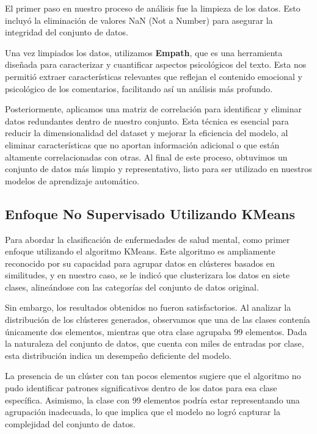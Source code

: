 \documentclass[
10pt, %
a4paper, %
oneside, %
headinclude,footinclude, %
BCOR5mm, %
]{scrartcl}
\begin{document}
El primer paso en nuestro proceso de análisis fue la limpieza de los datos. Esto incluyó la eliminación de valores NaN (Not a Number) para asegurar la integridad del conjunto de datos. 

Una vez limpiados los datos, utilizamos \textbf{Empath}, que es una herramienta diseñada para caracterizar y cuantificar aspectos psicológicos del texto. 
Esta nos permitió extraer características relevantes que reflejan el contenido emocional y psicológico de los comentarios, facilitando así un análisis más profundo.

Posteriormente, aplicamos una matriz de correlación para identificar y eliminar datos redundantes dentro de nuestro conjunto. 
Esta técnica es esencial para reducir la dimensionalidad del dataset y mejorar la eficiencia del modelo, al eliminar características que no aportan información adicional o que están altamente correlacionadas con otras. 
Al final de este proceso, obtuvimos un conjunto de datos más limpio y representativo, listo para ser utilizado en nuestros modelos de aprendizaje automático.


\subsection{Enfoque No Supervisado Utilizando KMeans}

Para abordar la clasificación de enfermedades de salud mental, como primer enfoque utilizando el algoritmo KMeans. Este algoritmo es ampliamente reconocido por su capacidad para agrupar datos en clústeres basados en similitudes, 
y en nuestro caso, se le indicó que clusterizara los datos en siete clases, alineándose con las categorías del conjunto de datos original.

Sin embargo, los resultados obtenidos no fueron satisfactorios. Al analizar la distribución de los clústeres generados, observamos que una de las clases contenía únicamente dos elementos, mientras que otra clase agrupaba 99 elementos. 
Dada la naturaleza del conjunto de datos, que cuenta con miles de entradas por clase, esta distribución indica un desempeño deficiente del modelo.

La presencia de un clúster con tan pocos elementos sugiere que el algoritmo no pudo identificar patrones significativos dentro de los datos para esa clase específica. Asimismo, la clase con 99 elementos podría estar representando una agrupación inadecuada,
lo que implica que el modelo no logró capturar la complejidad del conjunto de datos.
\end{document}
